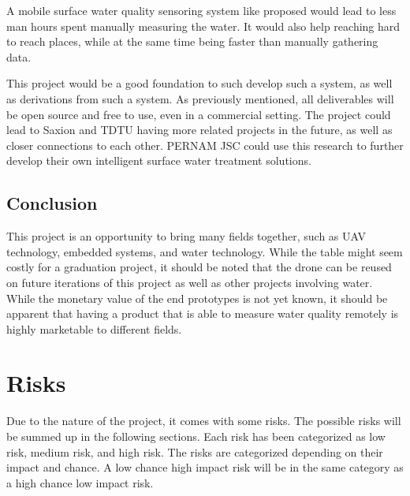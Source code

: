 \documentclass[11pt, a4paper]{article}
\begin{document}
A mobile surface water quality sensoring system like proposed would lead to less man hours spent manually measuring the water. It would also help reaching hard to reach places, while at the same time being faster than manually gathering data.

This project would be a good foundation to such develop such a system, as well as derivations from such a system. As previously mentioned, all deliverables will be open source and free to use, even in a commercial setting. The project could lead to Saxion and TDTU having more related projects in the future, as well as closer connections to each other. PERNAM JSC could use this research to further develop their own intelligent surface water treatment solutions.

\subsection{Conclusion}
This project is an opportunity to bring many fields together, such as UAV technology, embedded systems, and water technology. While the table might seem costly for a graduation project, it should be noted that the drone can be reused on future iterations of this project as well as other projects involving water. While the monetary value of the end prototypes is not yet known, it should be apparent that having a product that is able to measure water quality remotely is highly marketable to different fields.

\section{Risks}
Due to the nature of the project, it comes with some risks. The possible risks will be summed up in the following sections. Each risk has been categorized as low risk, medium risk, and high risk. The risks are categorized depending on their impact and chance. A low chance high impact risk will be in the same category as a high chance low impact risk.
\end{document}
